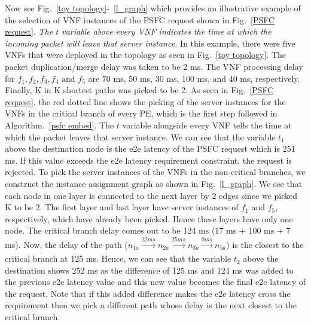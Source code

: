 \documentclass[journal]{IEEEtran}
\begin{document}
Now see Fig.~\ref{toy topology}-~\ref{l_graph} which provides an illustrative example of the selection of VNF instances of the PSFC request shown in Fig.~\ref{PSFC request}. \textit{The $t$ variable above every VNF indicates the time at which the incoming packet will leave that server instance.} In this example, there were five VNFs that were deployed in the topology as seen in Fig.~\ref{toy topology}. The packet duplication/merge delay was taken to be 2 ms. The VNF processing delay for $f_1, f_2, f_3, f_4 \text{ and } f_5$ are 70 ms, 50 ms, 30 ms, 100 ms, and 40 ms, respectively. Finally, K in K shortest paths was picked to be 2. As seen in Fig.~\ref{PSFC request}, the red dotted line shows the picking of the server instances for the VNFs in the critical branch of every PE, which is the first step followed in Algorithm.~\ref{psfc embed}. The $t$ variable alongside every VNF tells the time at which the packet leaves that server instance. We can see that the variable $t_1$ above the destination node is the e2e latency of the PSFC request which is 251 ms. If this value exceeds the e2e latency requirement constraint, the request is rejected. To pick the server instances of the VNFs in the non-critical branches, we construct the instance assignment graph as shown in Fig.~\ref{l_graph}. We see that each node in one layer is connected to the next layer by 2 edges since we picked K to be 2. The first layer and last layer have server instances of $f_1$ and $f_5$, respectively, which have already been picked. Hence these layers have only one node. The critical branch delay comes out to be 124 ms (17 ms + 100 ms + 7 ms). Now, the delay of the path ($n_{1a} \xrightarrow[]{22 ms} n_{2a} \xrightarrow[]{25 ms} n_{3a} \xrightarrow[]{0 ms} n_{5a}$) is the closest to the critical branch at 125 ms. Hence, we can see that the variable $t_2$ above the destination shows 252 ms as the difference of 125 ms and 124 ms was added to the previous e2e latency value and this new value becomes the final e2e latency of the request. Note that if this added difference makes the e2e latency cross the requirement then we pick a different path whose delay is the next closest to the critical branch.\\
\end{document}
